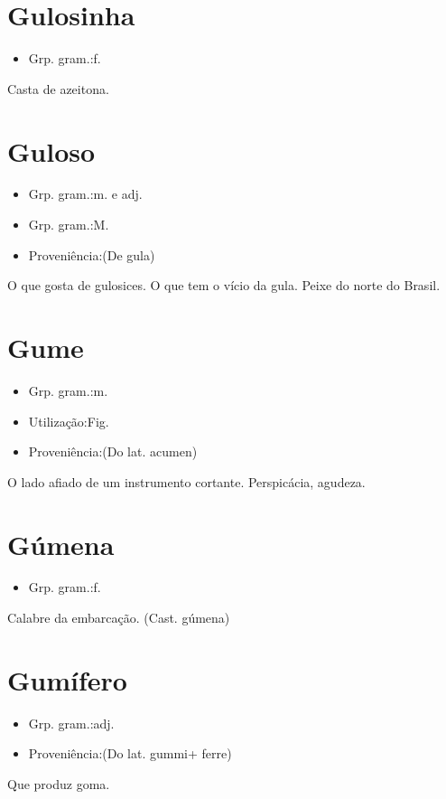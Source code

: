 \section{Gulosinha}
\begin{itemize}
\item {Grp. gram.:f.}
\end{itemize}
Casta de azeitona.
\section{Guloso}
\begin{itemize}
\item {Grp. gram.:m.  e  adj.}
\end{itemize}
\begin{itemize}
\item {Grp. gram.:M.}
\end{itemize}
\begin{itemize}
\item {Proveniência:(De \textunderscore gula\textunderscore )}
\end{itemize}
O que gosta de gulosices.
O que tem o vício da gula.
Peixe do norte do Brasil.
\section{Gume}
\begin{itemize}
\item {Grp. gram.:m.}
\end{itemize}
\begin{itemize}
\item {Utilização:Fig.}
\end{itemize}
\begin{itemize}
\item {Proveniência:(Do lat. \textunderscore acumen\textunderscore )}
\end{itemize}
O lado afiado de um instrumento cortante.
Perspicácia, agudeza.
\section{Gúmena}
\begin{itemize}
\item {Grp. gram.:f.}
\end{itemize}
Calabre da embarcação.
(Cast. \textunderscore gúmena\textunderscore )
\section{Gumífero}
\begin{itemize}
\item {Grp. gram.:adj.}
\end{itemize}
\begin{itemize}
\item {Proveniência:(Do lat. \textunderscore gummi\textunderscore  + \textunderscore ferre\textunderscore )}
\end{itemize}
Que produz goma.
